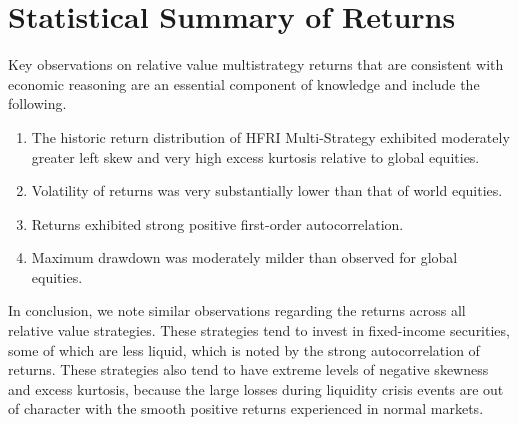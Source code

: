 \documentclass[11pt]{article}
\begin{document}
\section*{Statistical Summary of Returns}
Key observations on relative value multistrategy returns that are consistent with economic reasoning are an essential component of knowledge and include the following.

\begin{enumerate}
  \item The historic return distribution of HFRI Multi-Strategy exhibited moderately greater left skew and very high excess kurtosis relative to global equities.

  \item Volatility of returns was very substantially lower than that of world equities.

  \item Returns exhibited strong positive first-order autocorrelation.

  \item Maximum drawdown was moderately milder than observed for global equities.

\end{enumerate}

In conclusion, we note similar observations regarding the returns across all relative value strategies. These strategies tend to invest in fixed-income securities, some of which are less liquid, which is noted by the strong autocorrelation of returns. These strategies also tend to have extreme levels of negative skewness and excess kurtosis, because the large losses during liquidity crisis events are out of character with the smooth positive returns experienced in normal markets.
\end{document}

